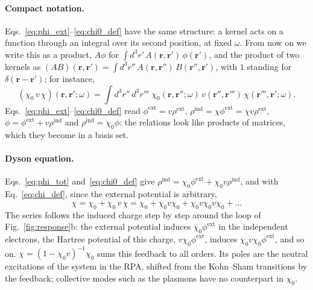 \documentclass[10pt,a4paper]{paper}
\begin{document}
\paragraph{Compact notation.} Eqs.~\eqref{eq:phi_ext}--\eqref{eq:chi0_def} have the same structure: a kernel acts on
a function through an integral over its second position, at fixed $\omega$. From now on we write this as a product,
$A\phi$ for $\int d^3r'\,A(\bm{r},\bm{r}')\,\phi(\bm{r}')$, and the product of two kernels as
$(AB)(\bm{r},\bm{r}') = \int d^3r''\,A(\bm{r},\bm{r}'')\,B(\bm{r}'',\bm{r}')$, with $1$ standing for
$\delta(\bm{r} - \bm{r}')$; for instance,
\begin{equation*}
(\chi_0\,v\,\chi)(\bm{r},\bm{r}';\omega)
= \int d^3r''\,d^3r'''\;\chi_0(\bm{r},\bm{r}'';\omega)\,v(\bm{r}'',\bm{r}''')\,\chi(\bm{r}''',\bm{r}';\omega) .
\end{equation*}
Eqs.~\eqref{eq:phi_ext}--\eqref{eq:chi0_def} read $\phi^{\mathrm{ext}} = v\rho^{\mathrm{ext}}$,
$\rho^{\mathrm{ind}} = \chi\phi^{\mathrm{ext}} = \chi v\rho^{\mathrm{ext}}$,
$\phi = \phi^{\mathrm{ext}} + v\rho^{\mathrm{ind}}$ and $\rho^{\mathrm{ind}} = \chi_0\phi$: the relations look like products of matrices, which they become in a basis set.

\paragraph{Dyson equation.} Eqs.~\eqref{eq:phi_tot} and~\eqref{eq:chi0_def} give
$\rho^{\mathrm{ind}} = \chi_0\phi^{\mathrm{ext}} + \chi_0 v\rho^{\mathrm{ind}}$, and with Eq.~\eqref{eq:chi_def},
since the external potential is arbitrary,
\begin{equation}
\chi = \chi_0 + \chi_0\,v\,\chi = \chi_0 + \chi_0v\chi_0 + \chi_0v\chi_0v\chi_0 + \dots
\label{eq:dyson_chi}
\end{equation}
The series follows the induced charge step by step around the loop of Fig.~\ref{fig:response}b: the external
potential induces $\chi_0\phi^{\mathrm{ext}}$ in the
independent electrons, the Hartree potential of this charge, $v\chi_0\phi^{\mathrm{ext}}$, induces
$\chi_0v\chi_0\phi^{\mathrm{ext}}$, and so on. $\chi = (1 - \chi_0 v)^{-1}\chi_0$ sums this feedback to all orders.
Its poles are the neutral excitations of the system in the RPA, shifted from the Kohn--Sham transitions by the
feedback; collective modes such as the plasmons have no counterpart in $\chi_0$.
\end{document}
